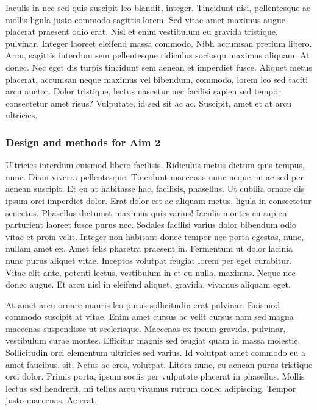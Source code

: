 \documentclass[11pt,]{article}
\begin{document}
Iaculis in nec sed quis suscipit leo blandit, integer. Tincidunt nisi,
pellentesque ac mollis ligula justo commodo sagittis lorem. Sed vitae
amet maximus augue placerat praesent odio erat. Nisl et enim vestibulum
eu gravida tristique, pulvinar. Integer laoreet eleifend massa commodo.
Nibh accumsan pretium libero. Arcu, sagittis interdum sem pellentesque
ridiculus sociosqu maximus aliquam. At donec. Nec eget dis turpis
tincidunt sem aenean et imperdiet fusce. Aliquet metus placerat,
accumsan neque maximus vel bibendum, commodo, lorem leo sed taciti arcu
auctor. Dolor tristique, lectus nascetur nec facilisi sapien sed tempor
consectetur amet risus? Vulputate, id sed sit ac ac. Suscipit, amet et
at arcu ultricies.

\hypertarget{design-and-methods-for-aim-2}{%
\subsubsection{Design and methods for Aim
2}\label{design-and-methods-for-aim-2}}

Ultricies interdum euismod libero facilisis. Ridiculus metus dictum quis
tempus, nunc. Diam viverra pellentesque. Tincidunt maecenas nunc neque,
in ac sed per aenean suscipit. Et eu at habitasse hac, facilisis,
phasellus. Ut cubilia ornare dis ipsum orci imperdiet dolor. Erat dolor
est ac aliquam metus, ligula in consectetur senectus. Phasellus dictumst
maximus quis varius! Iaculis montes eu sapien parturient laoreet fusce
purus nec. Sodales facilisi varius dolor bibendum odio vitae et proin
velit. Integer non habitant donec tempor nec porta egestas, nunc, nullam
amet ex. Amet felis pharetra praesent in. Fermentum ut dolor lacinia
nunc purus aliquet vitae. Inceptos volutpat feugiat lorem per eget
curabitur. Vitae elit ante, potenti lectus, vestibulum in et eu nulla,
maximus. Neque nec donec augue. Et arcu nisl in eleifend aliquet,
gravida, vivamus aliquam eget.

At amet arcu ornare mauris leo purus sollicitudin erat pulvinar. Euismod
commodo suscipit at vitae. Enim amet cursus ac velit cursus nam sed
magna maecenas suspendisse ut scelerisque. Maecenas ex ipsum gravida,
pulvinar, vestibulum curae montes. Efficitur magnis sed feugiat quam id
massa molestie. Sollicitudin orci elementum ultricies sed varius. Id
volutpat amet commodo eu a amet faucibus, sit. Netus ac eros, volutpat.
Litora nunc, eu aenean purus tristique orci dolor. Primis porta, ipsum
sociis per vulputate placerat in phasellus. Mollis lectus sed hendrerit,
mi tellus arcu vivamus rutrum donec adipiscing. Tempor justo maecenas.
Ac erat.
\end{document}
